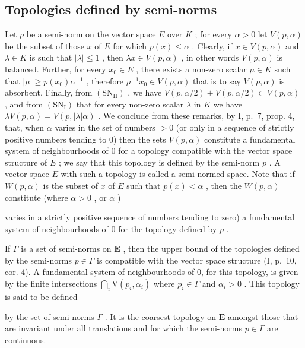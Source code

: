 \subsection{Topologies defined by semi-norms}

Let \(p\) be a semi-norm on the vector space \(E\) over \(K\) ; for every \(\alpha > 0\) let \(V(p, \alpha)\) be the subset of those \(x\) of \(E\) for which \(p(x) \leqslant \alpha\) . Clearly, if \(x \in V(p, \alpha)\) and \(\lambda \in K\) is such that \(|\lambda| \leqslant 1\) , then \(\lambda x \in V(p, \alpha)\) , in other words \(V(p, \alpha)\) is balanced. Further, for every \(x_0 \in E\) , there exists a non-zero scalar \(\mu \in K\) such that \(|\mu| \geqslant p(x_0) \alpha^{-1}\) , therefore \(\mu^{-1}x_0 \in V(p, \alpha)\) that is to say \(V(p, \alpha)\) is absorbent. Finally, from \((\mathrm{SN}_{\mathrm{II}})\) , we have \(V(p, \alpha/2) + V(p, \alpha/2) \subset V(p, \alpha)\) , and from \((\mathrm{SN}_{\mathrm{I}})\) that for every non-zero scalar \(\lambda\) in \(K\) we have \(\lambda V(p, \alpha) = V(p, |\lambda| \alpha)\) . We conclude from these remarks, by I, p.~7, prop. 4, that, when \(\alpha\) varies in the set of numbers \(> 0\) (or only in a sequence of strictly positive numbers tending to 0) then the sets \(V(p, \alpha)\) constitute a fundamental system of neighbourhoods of 0 for a topology compatible with the vector space structure of \(E\) ; we say that this topology is defined by the semi-norm \(p\) . A vector space \(E\) with such a topology is called a semi-normed space. Note that if \(W(p, \alpha)\) is the subset of \(x\) of \(E\) such that \(p(x) < \alpha\) , then the \(W(p, \alpha)\) constitute (where \(\alpha > 0\) , or \(\alpha\) )

varies in a strictly positive sequence of numbers tending to zero) a fundamental system of neighbourhoods of 0 for the topology defined by \(p\) .

If \(\Gamma\) is a set of semi-norms on \(\mathbf{E}\) , then the upper bound of the topologies defined by the semi-norms \(p \in \Gamma\) is compatible with the vector space structure (I, p.~10, cor. 4). A fundamental system of neighbourhoods of 0, for this topology, is given by the finite intersections \(\bigcap_{i} \mathrm{V}(p_i, \alpha_i)\) where \(p_i \in \Gamma\) and \(\alpha_i > 0\) . This topology is said to be defined

by the set of semi-norms \(\Gamma\) . It is the coarsest topology on \(\mathbf{E}\) amongst those that are invariant under all translations and for which the semi-norms \(p \in \Gamma\) are continuous.

